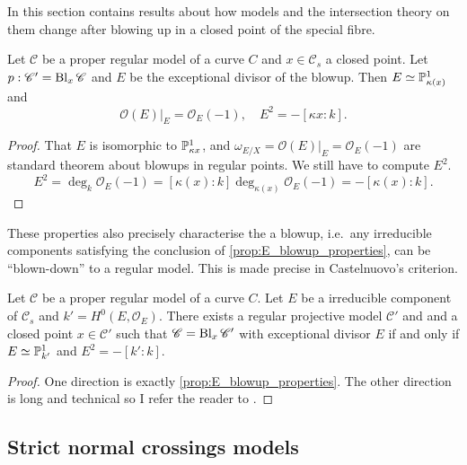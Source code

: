 In this section contains results about how models and the intersection theory on them change after blowing up in a closed point of the special fibre.  

\begin{proposition}\label{prop:E_blowup_properties}
	Let $\mathscr C$ be a proper regular model of a curve $C$ and $x \in \mathscr C_s$ a closed point. 
	Let $p: \mathscr C' = \operatorname{Bl}_x \mathscr C$ and $E$ be the exceptional divisor of the blowup. 
	Then $E \simeq \mathbb{P}^{1}_{\kappa(x)}$ and \[
		\mathcal{O}(E)|_E = \mathcal{O}_E(-1), \quad E^2 = -[\kappa x: k]
	.\] 
\end{proposition}
\begin{proof}
	That $E$ is isomorphic to $\mathbb{P}^{1}_{\kappa x}$, and $\omega_{E / X} = \mathcal{O}(E)|_E = \mathcal{O}_E(-1)$ are standard theorem about blowups in regular points. 
	We still have to compute $E^2$. 
	\[
		E^2 = \deg_k \mathcal{O}_E(-1) = [\kappa(x): k] \deg_{\kappa (x)} \mathcal{O}_E(-1) = -[\kappa(x): k]
	.\] 
\end{proof}

These properties also precisely characterise the a blowup, i.e.\ any irreducible components satisfying the conclusion of \cref{prop:E_blowup_properties}, can be ``blown-down'' to a regular model.
This is made precise in Castelnuovo's criterion. 

\begin{theorem}
	Let $\mathscr C$ be a proper regular model of a curve $C$.
	Let $E$ be a irreducible component of $\mathscr C_s$ and $k' = H^{0}(E, \mathcal{O}_E)$. 
	There exists a regular projective model $\mathscr C'$ and and a closed point $x \in \mathscr C'$ such that $\mathscr C = \operatorname{Bl}_x \mathscr C'$ with exceptional divisor $E$ if and only if $E \simeq \mathbb{P}_{k'}^{1}$ and $E^2 = -[k': k]$. 
\end{theorem}
\begin{proof}
	One direction is exactly \cref{prop:E_blowup_properties}. 
	The other direction is long and technical so I refer the reader to \cite[sec.\ 9.3.1]{liuAlgebraicGeometryArithmetic2002}.
\end{proof}

\subsection{Strict normal crossings models} \label{sec:strict_normal_crossings_models}

